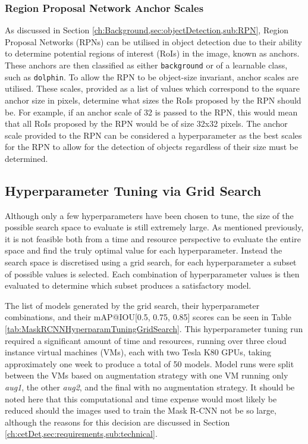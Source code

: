 \subsubsection{Region Proposal Network Anchor Scales}\label{ch:cetDet,sec:ModelSelection,sub:TrainingHyperparameters,subsub:RPNAnchorScales}

As discussed in Section \ref{ch:Background,sec:objectDetection,sub:RPN}, Region Proposal Networks (RPNs) can be utilised in object detection due to their ability to determine potential regions of interest (RoIs) in the image, known as anchors. These anchors are then classified as either \texttt{background} or of a learnable class, such as \texttt{dolphin}. To allow the RPN to be object-size invariant, anchor scales are utilised. These scales, provided as a list of values which correspond to the square anchor size in pixels, determine what sizes the RoIs proposed by the RPN should be. For example, if an anchor scale of 32 is passed to the RPN, this would mean that all RoIs proposed by the RPN would be of size 32x32 pixels. The anchor scale provided to the RPN can be considered a hyperparameter as the best scales for the RPN to allow for the detection of objects regardless of their size must be determined. 

\subsection{Hyperparameter Tuning via Grid Search}\label{ch:cetDet,sec:ModelSelection,sub:HyperparameterTuning}

Although only a few hyperparameters have been chosen to tune, the size of the possible search space to evaluate is still extremely large. As mentioned previously, it is not feasible both from a time and resource perspective to evaluate the entire space and find the truly optimal value for each hyperparameter. Instead the search space is discretised using a grid search, for each hyperparameter a subset of possible values is selected. Each combination of hyperparameter values is then evaluated to determine which subset produces a satisfactory model. 

The list of models generated by the grid search, their hyperparameter combinations, and their mAP@IOU[0.5, 0.75, 0.85] scores can be seen in Table \ref{tab:MaskRCNNHyperparamTuningGridSearch}. This hyperparameter tuning run required a significant amount of time and resources, running over three cloud instance virtual machines (VMs), each with two Tesla K80 GPUs, taking approximately one week to produce a total of 50 models. Model runs were split between the VMs based on augmentation strategy with one VM running only \textit{aug1}, the other \textit{aug2}, and the final with no augmentation strategy. It should be noted here that this computational and time expense would most likely be reduced should the images used to train the Mask R-CNN not be so large, although the reasons for this decision are discussed in Section \ref{ch:cetDet,sec:requirements,sub:technical}.

